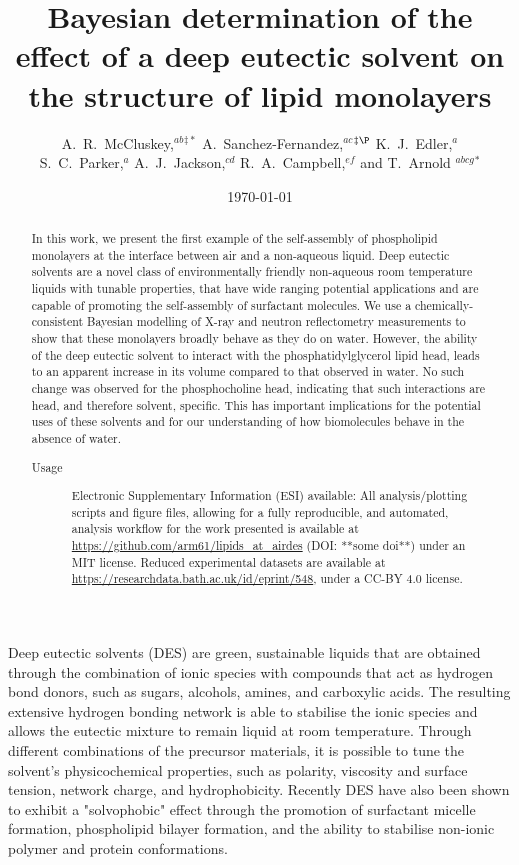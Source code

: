 \documentclass[twocolumn,a4paper]{paper}
\title{Bayesian determination of the effect of a deep eutectic solvent on the structure of lipid monolayers}
\author{A.~R.~McCluskey,\textit{$^{ab}$}$^{\ddag\ast}$ A.~Sanchez-Fernandez,\textit{$^{ac}$}$^{\ddag\P}$ K.~J.~Edler,\textit{$^{a}$} \\
S.~C.~Parker,\textit{$^{a}$} A.~J.~Jackson,\textit{$^{cd}$} R.~A.~Campbell,\textit{$^{ef}$} and T.~Arnold \textit{$^{abcg}$}$^{\ast}$}
\date{\today}
\begin{document}
\maketitle

\begin{abstract}
In this work, we present the first example of the self-assembly of phospholipid monolayers at the interface between air and a non-aqueous liquid.
Deep eutectic solvents are a novel class of environmentally friendly non-aqueous room temperature liquids with tunable properties, that have wide ranging potential applications and are capable of promoting the self-assembly of surfactant molecules.
We use a chemically-consistent Bayesian modelling of X-ray and neutron reflectometry measurements to show that these monolayers broadly behave as they do on water.
However, the ability of the deep eutectic solvent to interact with the phosphatidylglycerol lipid head, leads to an apparent increase in its volume compared to that observed in water.
No such change was observed for the phosphocholine head, indicating that such interactions are head, and therefore solvent, specific.
This has important implications for the potential uses of these solvents and for our understanding of how biomolecules behave in the absence of water.
\begin{description}
\item[Usage]
Electronic Supplementary Information (ESI) available: All analysis/plotting scripts and figure files, allowing for a fully reproducible, and automated, analysis workflow for the work presented is available at \url{https://github.com/arm61/lipids_at_airdes} (DOI: **some doi**) under an MIT license.
Reduced experimental datasets are available at \url{https://researchdata.bath.ac.uk/id/eprint/548}, under a CC-BY 4.0 license.
\end{description}
\end{abstract}

Deep eutectic solvents (DES) are green, sustainable liquids that are obtained through the combination of ionic species with compounds that act as hydrogen bond donors, such as sugars, alcohols, amines, and carboxylic acids\cite{Smith2014,Dai2013}.
The resulting extensive hydrogen bonding network is able to stabilise the ionic species and allows the eutectic mixture to remain liquid at room temperature\cite{Hammond2016,Hammond2017,Araujo2017}.
Through different combinations of the precursor materials, it is possible to tune the solvent's physicochemical properties, such as polarity\cite{Pandey2014}, viscosity and surface tension\cite{Smith2014}, network charge\cite{Zahn2016}, and hydrophobicity\cite{Ribeiro2015,vanOsch2015}.
Recently DES have also been shown to exhibit a "solvophobic" effect through the promotion of surfactant micelle formation\cite{Sanchez-Fernandez2016,Arnold2015,Hsieh2018,Banjare2018}, phospholipid bilayer formation\cite{Bryant2017,Bryant2016,Gutierrez2009}, and the ability to stabilise non-ionic polymer\cite{Sapir2016} and protein conformations\cite{Sanchez-Fernandez2017}.
\end{document}
